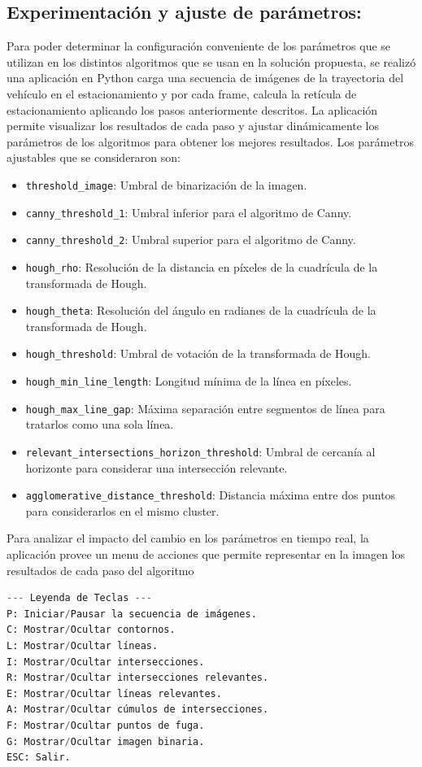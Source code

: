 \subsection{Experimentación y ajuste de parámetros:}\label{subsec:experimentacion-y-ajuste-de-parametros:}
Para poder determinar la configuración conveniente de los parámetros que se utilizan en los distintos algoritmos que se usan en la solución propuesta,
se realizó una aplicación en Python carga una secuencia de imágenes de la trayectoria del vehículo en el estacionamiento y por cada frame,
calcula la retícula de estacionamiento aplicando los pasos anteriormente descritos.
La aplicación permite visualizar los resultados de cada paso y ajustar dinámicamente los parámetros de los algoritmos para obtener los mejores resultados.
Los parámetros ajustables que se consideraron son:
\begin{itemize}
    \item \texttt{threshold\_image}: Umbral de binarización de la imagen.
    \item \texttt{canny\_threshold\_1}: Umbral inferior para el algoritmo de Canny.
    \item \texttt{canny\_threshold\_2}: Umbral superior para el algoritmo de Canny.
    \item \texttt{hough\_rho}: Resolución de la distancia en píxeles de la cuadrícula de la transformada de Hough.
    \item \texttt{hough\_theta}: Resolución del ángulo en radianes de la cuadrícula de la transformada de Hough.
    \item \texttt{hough\_threshold}: Umbral de votación de la transformada de Hough.
    \item \texttt{hough\_min\_line\_length}: Longitud mínima de la línea en píxeles.
    \item \texttt{hough\_max\_line\_gap}: Máxima separación entre segmentos de línea para tratarlos como una sola línea.
    \item \texttt{relevant\_intersections\_horizon\_threshold}: Umbral de cercanía al horizonte para considerar una intersección relevante.
    \item \texttt{agglomerative\_distance\_threshold}: Distancia máxima entre dos puntos para considerarlos en el mismo cluster.
\end{itemize}
Para analizar el impacto del cambio en los parámetros en tiempo real, la aplicación provee un menu de acciones que permite
representar en la imagen los resultados de cada paso del algoritmo
\begin{lstlisting}[language=Python,label={lst:lstlisting22}]
    --- Leyenda de Teclas ---
P: Iniciar/Pausar la secuencia de imágenes.
C: Mostrar/Ocultar contornos.
L: Mostrar/Ocultar líneas.
I: Mostrar/Ocultar intersecciones.
R: Mostrar/Ocultar intersecciones relevantes.
E: Mostrar/Ocultar líneas relevantes.
A: Mostrar/Ocultar cúmulos de intersecciones.
F: Mostrar/Ocultar puntos de fuga.
G: Mostrar/Ocultar imagen binaria.
ESC: Salir.
\end{lstlisting}

